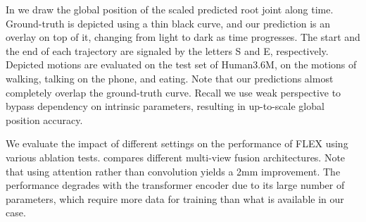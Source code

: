 
In  we draw the global position of the scaled predicted root joint along time.
Ground-truth is depicted using a thin black curve, and our prediction is an overlay on top of it, changing from light to dark as time progresses. The start and the end of each trajectory are signaled by the letters S and E, respectively.
Depicted motions are evaluated on the test set of Human3.6M, on the motions of walking, talking on the phone, and eating.
Note that our predictions almost completely overlap the ground-truth curve. 
Recall we use weak perspective to bypass dependency on intrinsic parameters, resulting in up-to-scale global position accuracy. 

% 


\ifeccv{
    
}
\else{
    
    
}
\fi

We evaluate the impact of different settings on the performance of FLEX using various ablation tests. 
 compares different multi-view fusion architectures.  
Note that using attention rather than convolution yields a 2mm improvement.
The performance degrades with the transformer encoder due to its large number of parameters, which require more data for training than what is available in our case.


